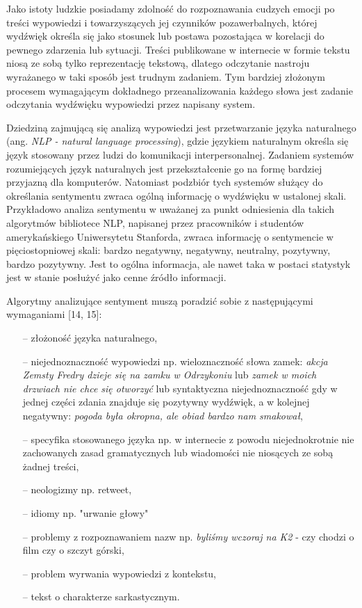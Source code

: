 Jako istoty ludzkie posiadamy zdolność do rozpoznawania cudzych emocji po treści wypowiedzi i towarzyszących jej czynników pozawerbalnych, której wydźwięk określa się jako stosunek lub postawa pozostająca w korelacji do pewnego zdarzenia lub sytuacji. Treści publikowane w internecie w formie tekstu niosą ze sobą tylko reprezentację tekstową, dlatego odczytanie nastroju wyrażanego w taki sposób jest trudnym zadaniem. Tym bardziej złożonym procesem wymagającym dokładnego przeanalizowania każdego słowa jest zadanie odczytania wydźwięku wypowiedzi przez napisany system. 

Dziedziną zajmującą się analizą wypowiedzi jest przetwarzanie języka naturalnego (ang. \textit{NLP - natural language processing}), gdzie językiem naturalnym określa się język stosowany przez ludzi do komunikacji interpersonalnej. Zadaniem systemów rozumiejących język naturalnych jest przekształcenie go na formę bardziej przyjazną dla komputerów. Natomiast podzbiór tych systemów służący do określania sentymentu zwraca ogólną informację o wydźwięku w ustalonej skali. Przykładowo analiza sentymentu w uważanej za punkt odniesienia dla takich algorytmów bibliotece NLP, napisanej przez pracowników i studentów amerykańskiego Uniwersytetu Stanforda, zwraca informację o sentymencie w pięciostopniowej skali: bardzo negatywny, negatywny, neutralny, pozytywny, bardzo pozytywny. Jest to ogólna informacja, ale nawet taka w postaci statystyk jest w stanie posłużyć jako cenne źródło informacji.

Algorytmy analizujące sentyment muszą poradzić sobie z następującymi wymaganiami [14, 15]:
\begin{itemize}
	\item[--] złożoność języka naturalnego,
	\item[--] niejednoznaczność wypowiedzi np. wieloznaczność słowa zamek: \textit{akcja Zemsty Fredry dzieje się na zamku w Odrzykoniu} lub \textit{zamek w moich drzwiach nie chce się otworzyć} lub syntaktyczna niejednoznaczność gdy w jednej części zdania znajduje się pozytywny wydźwięk, a w kolejnej negatywny: \textit{pogoda była okropna, ale obiad bardzo nam smakował},
	\item[--] specyfika stosowanego języka np. w internecie z powodu niejednokrotnie nie zachowanych zasad gramatycznych lub wiadomości nie niosących ze sobą żadnej treści,
	\item[--] neologizmy np. retweet,
	\item[--] idiomy np. "urwanie głowy"
	\item[--] problemy z rozpoznawaniem nazw np. \textit{byliśmy wczoraj na K2} - czy chodzi o film czy o szczyt górski,
	\item[--] problem wyrwania wypowiedzi z kontekstu,
	\item[--] tekst o charakterze sarkastycznym.
\end{itemize}

